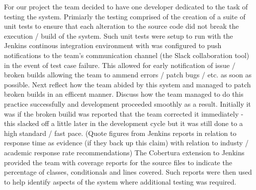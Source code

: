 \documentclass{l3proj}
\begin{document}



For our project the team decided to have one developer dedicated to the task of testing the system. %
Primiarly the testing comprised of the creation of a suite of unit tests to ensure that each alteration to the source code did not break the execution / build of the system. Such unit tests were setup to run with the Jenkins continous integration environment with was configured to push notifications to the team's communication channel (the Slack collaboration tool) in the event of test case failure. %
This allowed for early notification of issue / broken builds allowing the team to ammend errors / patch bugs / etc. as soon as possible. %
Next reflect how the team abided by this system and managed to patch broken builds in an efficent manner. Discuss how the team managed to do this practice successfully and development proceeded smoothly as a result. Initially it was if the broken builid was reported that the team corrected it immediately - this slacked off a little later in the development cycle but it was still done to a high standard / fast pace. (Quote figures from Jenkins reports in relation to response time as evidence (if they back up this claim) with relation to industy / academic response rate recommendations)
The Cobertura extension to Jenkins provided the team with coverage reports for the source files to indicate the percentage of classes, conditionals and lines covered. Such reports were then used to help identify aspects of the system where additional testing was required. %
\end{document}
